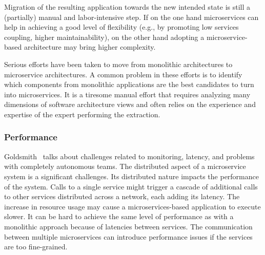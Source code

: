 Migration of the resulting application towards the new intended state is still a (partially) manual and labor-intensive step.\cite{overeem2018} If on the one hand microservices can help in achieving a good level of flexibility (e.g., by promoting low services coupling, higher maintainability), on the other hand adopting a microservice-based architecture may bring higher complexity.\cite{Difrancesco2017} %


Serious efforts have been taken to move from monolithic architectures to microservice architectures. A common problem in these efforts is to identify which components from monolithic applications are the best candidates to turn into microservices. It is a tiresome manual effort that requires analyzing many dimensions of software architecture views and often relies on the experience and expertise of the expert performing the extraction.\cite{Kamimura2018, selmadji2020}

\subsubsection{Performance}%

Goldsmith~\cite{Kevin2015} talks about challenges related to monitoring, latency, and problems with completely autonomous teams. The distributed aspect of a microservice system is a significant challenges.\cite{Matt2016} Its distributed nature impacts the performance of the system. Calls to a single service might trigger a cascade of additional calls to other services distributed across a network, each adding its latency. The increase in resource usage may cause a microservices-based application to execute slower.\cite{Etsy, Netflix} It can be hard to achieve the same level of performance as with a monolithic approach because of latencies between services. The communication between multiple microservices can introduce performance issues if the services are too fine-grained.  


